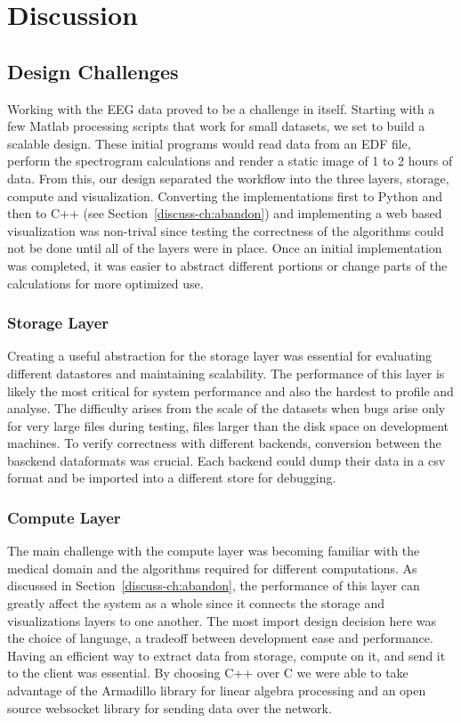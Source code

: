 \chapter{Discussion}\label{discuss-ch}

\section{Design Challenges}

Working with the EEG data proved to be a challenge in itself. Starting with a
few Matlab processing scripts that work for small datasets, we set to build a
scalable design. These initial programs would read data from an EDF file,
perform the spectrogram calculations and render a static image of 1 to 2 hours
of data. From this, our design separated the workflow into the three layers,
storage, compute and visualization. Converting the implementations first to
Python and then to C++ (see Section~\ref{discuss-ch:abandon}) and implementing
a web based visualization was non-trival since testing the correctness of the
algorithms could not be done until all of the layers were in place. Once an
initial implementation was completed, it was easier to abstract different
portions or change parts of the calculations for more optimized use. \\

\subsection{Storage Layer}

Creating a useful abstraction for the storage layer was essential for
evaluating different datastores and maintaining scalability. The performance of
this layer is likely the most critical for system performance and also the
hardest to profile and analyse. The difficulty arises from the scale of the
datasets when bugs arise only for very large files during testing, files larger
than the disk space on development machines. To verify correctness with
different backends, conversion between the basckend dataformats was crucial.
Each backend could dump their data in a csv format and be imported into a
different store for debugging.

\subsection{Compute Layer}

The main challenge with the compute layer was becoming familiar with the
medical domain and the algorithms required for different computations. As
discussed in Section~\ref{discuss-ch:abandon}, the performance of this layer
can greatly affect the system as a whole since it connects the storage and
visualizations layers to one another. The most import design decision here was
the choice of language, a tradeoff between development ease and performance.
Having an efficient way to extract data from storage, compute on it, and send
it to the client was essential. By choosing C++ over C we were able to take
advantage of the Armadillo \cite{arma} library for linear algebra processing
and an open source websocket library \cite{websocket-server} for sending data
over the network.

